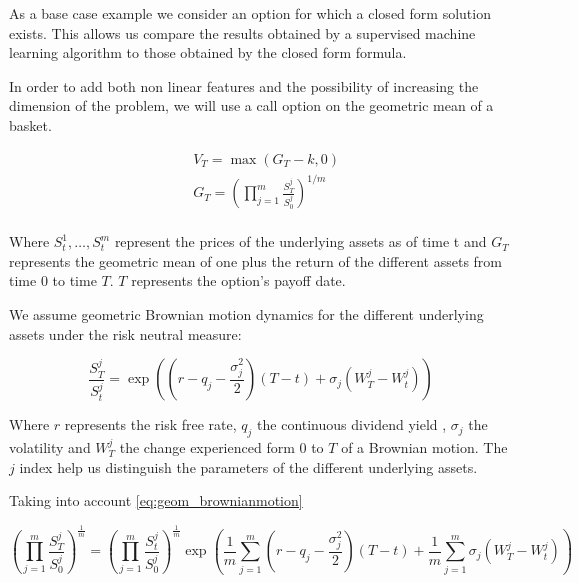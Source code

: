 As a base case example we consider an option for which a closed form solution exists. This allows us compare the results obtained by a supervised machine learning algorithm to those obtained by the closed form formula.

In order to add both non linear features and the possibility of increasing the dimension of the problem, we will use a call option on the geometric mean of a basket.

\begin{equation}\label{eq:geom_digital}
\begin{aligned}
&V_{T}=\max\left(G_T-k,0\right) \\
&G_{T}=\left(\prod_{j=1}^{m} \frac{S_{T}^{j}}{S_{0}^{j}}\right)^{1 / m} \\
\end{aligned}
\end{equation}

Where $S_t^1,\ldots,S_t^m$ represent the prices of the underlying assets as of time t and $G_T$ represents the geometric mean of one plus the return of the different assets from time $0$ to time $T$. $T$ represents the option's payoff date.

We assume geometric Brownian motion dynamics for the different underlying assets under the risk neutral measure:

\begin{equation}\label{eq:geom_brownianmotion}
\frac{S_{T}^{j}}{S_{t}^{j}}=\exp\left(\left(r-q_{j}-\frac{\sigma_{j}^{2}}{2}\right) \left( T - t\right)+\sigma_{j} \left(W_{T}^{j}-W_{t}^{j}\right)\right)
\end{equation}

Where $r$ represents the risk free rate, $q_j$ the continuous dividend yield , $\sigma_j$ the volatility and $W_T^j$ the change experienced form $0$ to $T$ of a Brownian motion. The $j$ index help us distinguish the parameters of the different underlying assets.

Taking into account \ref{eq:geom_brownianmotion}

\begin{equation}\label{eq:geom_digital_distrib}
\left(\prod_{j=1}^m\frac{S_{T}^{j}}{S_{0}^{j}}\right)^{\frac{1}{m}} =\left(\prod_{j=1}^m\frac{S_{t}^{j}}{S_{0}^{j}}\right)^{\frac{1}{m}}\exp\left(\frac{1}{m} \sum_{j=1}^{m}\left(r-q_{j}-\frac{\sigma_{j}^{2}}{2}\right) \left(T-t\right)+\frac{1}{m} \sum_{j=1}^{m} \sigma_{j} \left(W_{T}^{j}-W_{t}^{j}\right)\right) 
\end{equation}

